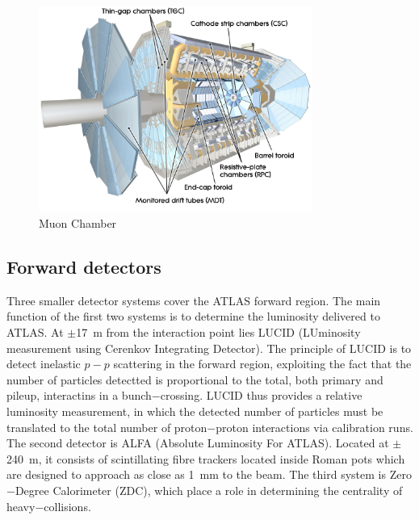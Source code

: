 \begin{figure}[htbp]
  \begin{center}
      \includegraphics[width=0.8\textwidth]{Fig2/MuonChamber.pdf}
    \caption{Muon Chamber}
    \label{fig:MUON1}
  \end{center}
\end{figure}

\subsection{Forward detectors}\label{sec:forward}

Three smaller detector systems cover the ATLAS forward region. The main function of the first two systems is to determine the luminosity delivered to ATLAS. At $\pm$17~m from the interaction point lies LUCID (LUminosity measurement using Cerenkov Integrating Detector). The principle of LUCID is to detect inelastic $p-p$ scattering in the forward region, exploiting the fact that the number of particles detectted is proportional to the total, both primary and pileup, interactins in a bunch$-$crossing.  LUCID thus provides a relative luminosity measurement, in which the detected number of particles must be translated to the total number of proton$-$proton interactions via calibration runs.
The second detector is ALFA (Absolute Luminosity For ATLAS). Located at $\pm$240~m, it consists of scintillating fibre trackers located inside Roman pots which are designed to approach as close as 1~mm to the beam. 
The third system is Zero$-$Degree Calorimeter (ZDC), which place a role in determining the centrality of heavy$-$collisions.



